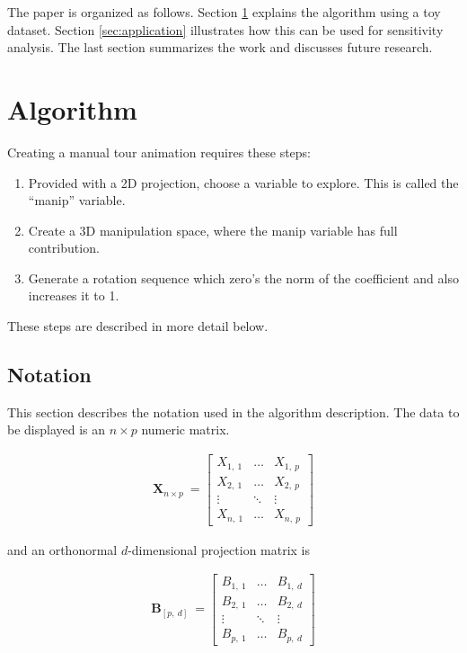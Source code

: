\documentclass{monashthesis}
\begin{document}
The paper is organized as follows. Section \ref{sec:algorithm} explains
the algorithm using a toy dataset. Section \ref{sec:application}
illustrates how this can be used for sensitivity analysis. The last
section summarizes the work and discusses future research.

\section{Algorithm}\label{sec:algorithm}

Creating a manual tour animation requires these steps:

\begin{enumerate}
\def\labelenumi{\arabic{enumi}.}
\tightlist
\item
  Provided with a 2D projection, choose a variable to explore. This is
  called the ``manip'' variable.
\item
  Create a 3D manipulation space, where the manip variable has full
  contribution.
\item
  Generate a rotation sequence which zero's the norm of the coefficient
  and also increases it to 1.
\end{enumerate}

These steps are described in more detail below.

\subsection{Notation}\label{notation}

This section describes the notation used in the algorithm description.
The data to be displayed is an \(n \times p\) numeric matrix.

\begin{align*}
  \textbf{X}_{n \times p} ~=
  \begin{bmatrix}
    X_{1,~1} & \dots  & X_{1,~p} \\
    X_{2,~1} & \dots  & X_{2,~p} \\
    \vdots   & \ddots & \vdots   \\
    X_{n,~1} & \dots  & X_{n,~p}
  \end{bmatrix}
\end{align*}

and an orthonormal \(d\)-dimensional projection matrix is

\begin{align*}
  \textbf{B}_{[p,~d]} ~=
  \begin{bmatrix}
    B_{1,~1} & \dots  & B_{1,~d} \\
    B_{2,~1} & \dots  & B_{2,~d} \\
    \vdots   & \ddots & \vdots   \\
    B_{p,~1} & \dots  & B_{p,~d}
  \end{bmatrix}
\end{align*}
\end{document}
